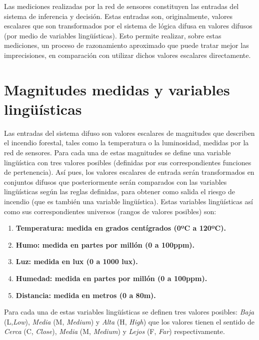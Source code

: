 Las mediciones realizadas por la red de sensores constituyen las entradas del sistema de inferencia y decisión. Estas entradas son, originalmente, valores escalares que son transformados por el sistema de lógica difusa en valores difusos (por medio de variables lingüísticas). Esto permite realizar, sobre estas mediciones, un proceso de razonamiento aproximado que puede tratar mejor las imprecisiones, en comparación con utilizar dichos valores escalares directamente.


\section{Magnitudes medidas y variables lingüísticas}

Las entradas del sistema difuso son valores escalares de magnitudes que describen el incendio forestal, tales como la temperatura o la luminosidad, medidas por la red de sensores. Para cada una de estas magnitudes se define una variable lingüística con tres valores posibles (definidas por sus correspondientes funciones de pertenencia). Así pues, los valores escalares de entrada serán transformados en conjuntos difusos que posteriormente serán comparados con las variables lingüísticas según las reglas definidas, para obtener como salida el riesgo de incendio (que es también una variable lingüística). Estas variables lingüísticas así como sus correspondientes universos (rangos de valores posibles) son:

\begin{enumerate}[label=($\chi_\arabic*$),ref=(X\arabic*)]
   \item \bfseries Temperatura: \normalfont medida en grados centígrados (0ºC a 120ºC).
   \item \bfseries Humo: \normalfont medida en partes por millón (0 a 100ppm).
   \item \bfseries Luz: \normalfont medida en lux (0 a 1000 lux).
   \item \bfseries Humedad: \normalfont medida en partes por millón (0 a 100ppm).
   \item \bfseries Distancia: \normalfont medida en metros (0 a 80m).
\end{enumerate}

Para cada una de estas variables lingüísticas se definen tres valores posibles: \emph{Baja} (L,\emph{Low}), \emph{Media} (M, \emph{Medium}) y \emph{Alta} (H, \emph{High}) que los valores tienen el sentido de \emph{Cerca} (C, \emph{Close}), \emph{Media} (M, \emph{Medium}) y \emph{Lejos} (F, \emph{Far}) respectivamente.

